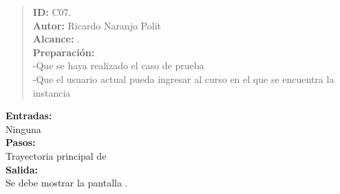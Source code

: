 

\begin{quote} %
	\textbf{ID:} C07.\\
    \textbf{Autor: } Ricardo Naranjo Polit\\
	\textbf{Alcance:}  .\\
    \textbf{Preparación:}\\
      -Que se haya realizado el caso de prueba \\
      -Que el usuario actual pueda ingresar al curso en el que se encuentra la instancia
\end{quote}

    \textbf{Entradas:}\\
    Ninguna\\
    \textbf{Pasos:}\\

    Trayectoria principal de \\

    \textbf{Salida:}\\

    Se debe mostrar la pantalla .
